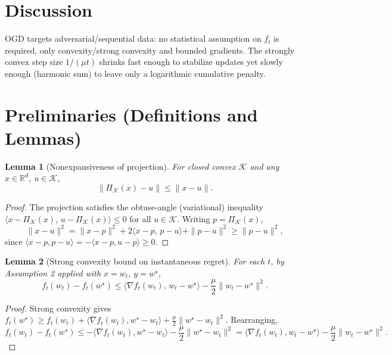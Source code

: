 \documentclass[11pt]{article}
\newtheorem{lemma}{Lemma}
\begin{document}
\section*{Discussion}
OGD targets adversarial/sequential data: no statistical assumption on $f_t$ is required,
only convexity/strong convexity and bounded gradients. The strongly convex step size 
$1/(\mu t)$ shrinks fast enough to stabilize updates yet slowly enough (harmonic sum)
to leave only a logarithmic cumulative penalty.

\section*{Preliminaries (Definitions and Lemmas)}

\begin{lemma}[Nonexpansiveness of projection]\label{lem:proj}
For closed convex $\mathcal{K}$ and any $x \in \mathbb{R}^d$, $u\in\mathcal{K}$,
\[
\|\Pi_{\mathcal{K}}(x) - u\| \le \|x - u\|.
\]
\end{lemma}
\begin{proof}
The projection satisfies the obtuse-angle (variational) inequality
$\langle x - \Pi_{\mathcal{K}}(x),\, u - \Pi_{\mathcal{K}}(x)\rangle \le 0$ for all $u\in\mathcal{K}$.
Writing $p=\Pi_{\mathcal{K}}(x)$,
\[
\|x-u\|^2 = \|x-p\|^2 + 2\langle x-p,\, p-u\rangle + \|p-u\|^2 
\ge \|p-u\|^2,
\]
since $\langle x-p, p-u\rangle = -\langle x-p, u-p\rangle \ge 0$.
\end{proof}

\begin{lemma}[Strong convexity bound on instantaneous regret]\label{lem:sc}
For each $t$, by Assumption 2 applied with $x=w_t$, $y=w^\star$,
\[
f_t(w_t) - f_t(w^\star) \le \langle \nabla f_t(w_t),\, w_t - w^\star\rangle 
- \frac{\mu}{2}\|w_t - w^\star\|^2 .
\]
\end{lemma}
\begin{proof}
Strong convexity gives
$f_t(w^\star) \ge f_t(w_t) + \langle \nabla f_t(w_t), w^\star - w_t\rangle + \frac{\mu}{2}\|w^\star-w_t\|^2$.
Rearranging,
\[
f_t(w_t)-f_t(w^\star) \le -\langle \nabla f_t(w_t), w^\star-w_t\rangle - \frac{\mu}{2}\|w^\star-w_t\|^2
= \langle \nabla f_t(w_t), w_t-w^\star\rangle - \frac{\mu}{2}\|w_t-w^\star\|^2.
\]
\end{proof}

\end{document}
